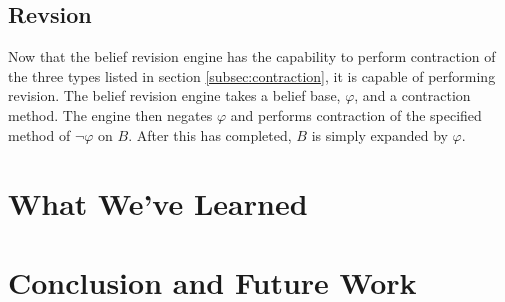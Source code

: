 \documentclass[a4paper,10pt]{article}
\begin{document}
\subsection{Revsion}
\label{subsec:revision}
Now that the belief revision engine has the capability to perform contraction of the three types listed in section \ref{subsec:contraction}, it is capable of performing revision. The belief revision engine takes a belief base, $\varphi$, and a contraction method. The engine then negates $\varphi$ and performs contraction of the specified method of $\neg\varphi$ on $B$. After this has completed, $B$ is simply expanded by $\varphi$.



\section{What We've Learned}
\label{sec:learned}


\section{Conclusion and Future Work}
\label{sec:conclusion}



\end{document}

